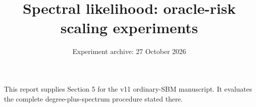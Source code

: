 \documentclass[11pt,a4paper]{article}
\title{Spectral likelihood: oracle-risk scaling experiments}
\author{}
\date{Experiment archive: 27 October 2026}
\begin{document}
\maketitle
\noindent This report supplies Section 5 for the v11 ordinary-SBM manuscript. It evaluates the complete degree-plus-spectrum procedure stated there.
\setcounter{section}{4}

\end{document}
